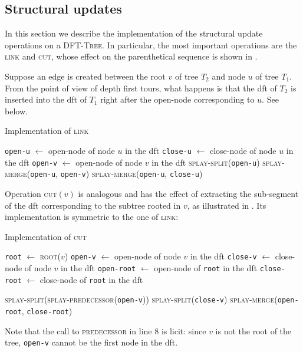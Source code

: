 \documentclass[a4paper,USenglish]{lipics}
\newcommand{\var}[1]{\textrm{\texttt{#1}}}
\newcommand{\dft}{\textsc{DFT-Tree}}
\begin{document}
		\subsection{Structural updates}
		
In this section we describe the implementation of the structural update operations on a \dft. In particular, the most important operations are the \textsc{link} and \textsc{cut}, whose effect on the parenthetical sequence is shown in .

Suppose an edge is created between the root $v$ of tree $T_2$ and node $u$ of tree $T_1$. From the point of view of depth first tours, what happens is that the dft of $T_2$ is inserted into the dft of $T_1$ right after the open-node corresponding to $u$. See  below.

		\begin{algorithm}[H]
		  \small
		  \caption{\small Implementation of \textsc{link} \label{alg:link}}
		  \begin{algorithmic}[1]
			    \State \var{open-u} $\gets$ open-node of node $u$ in the dft
			   	\State \var{close-u} $\gets$ close-node of node $u$ in the dft
			   	\State \var{open-v} $\gets$ open-node of node $v$ in the dft
		    	\State \textsc{splay-split}(\var{open-u})
		    	\State \textsc{splay-merge}(\var{open-u}, \var{open-v})
		    	\State \textsc{splay-merge}(\var{open-u}, \var{close-u})
		    \EndIf
		    \EndProcedure
		  \end{algorithmic}
		\end{algorithm}	
		
		Operation \textsc{cut}$(v)$ is analogous and has the effect of extracting the sub-segment of the dft corresponding to the subtree rooted in $v$, as illustrated in . Its implementation is symmetric to the one of \textsc{link}:
		\begin{algorithm}[H]
		  \small
		  \caption{\small Implementation of \textsc{cut}}
		  \begin{algorithmic}[1]
		    \State \var{root} $\gets$ \textsc{root}($v$)
		    \If{$v$ $\neq$ \var{root}}
				\State \var{open-v} $\gets$ open-node of node $v$ in the dft
				\State \var{close-v} $\gets$ close-node of node $v$ in the dft
				\State \var{open-root} $\gets$ open-node of \var{root} in the dft
				\State \var{close-root} $\gets$ close-node of \var{root} in the dft

				\State \textsc{splay-split}(\textsc{splay-predecessor}(\var{open-v}))
				\State \textsc{splay-split}(\var{close-v})
				\State \textsc{splay-merge}(\var{open-root}, \var{close-root})
		    \EndIf
		    \EndProcedure
		  \end{algorithmic}
		\end{algorithm}	
		Note that the call to \textsc{predecessor} in line 8 is licit: since $v$ is not the root of the tree, \var{open-v} cannot be the first node in the dft.
		
\end{document}
